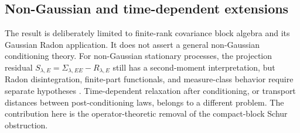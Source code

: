 \subsection{Non-Gaussian and time-dependent extensions}
\label{sec:discussion:non-gaussian}

The result is deliberately limited to finite-rank covariance block algebra and
its Gaussian Radon application.  It does not assert a general non-Gaussian
conditioning theory.  For non-Gaussian stationary processes, the projection
residual $S_{\lambda,E}=\Sigma_{\lambda,EE}-R_{\lambda,E}$ still has a
second-moment interpretation, but Radon disintegration, finite-part
functionals, and measure-class behavior require separate hypotheses
\cite{bogachev2007measure,kallenberg2021foundations}.  Time-dependent relaxation
after conditioning, or transport distances between post-conditioning laws,
belongs to a different problem.  The contribution here is the
operator-theoretic removal of the compact-block Schur obstruction.
